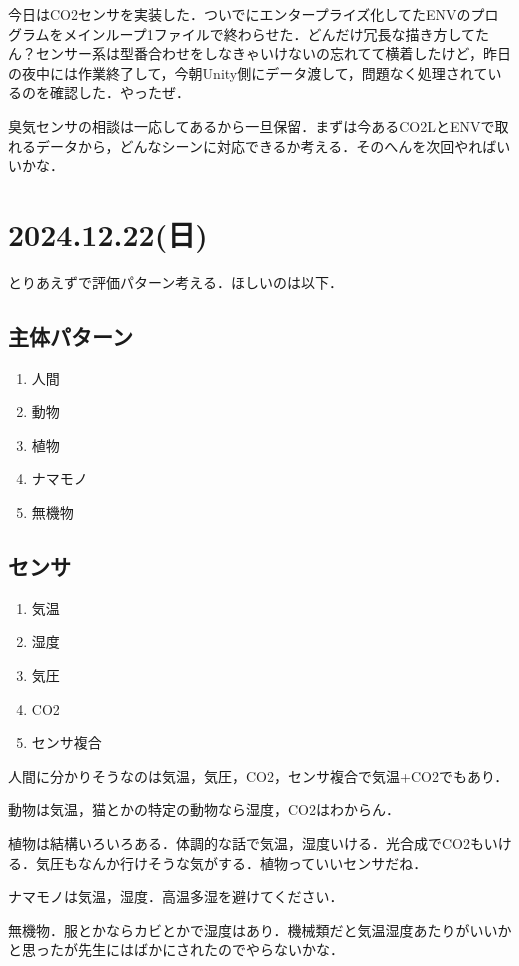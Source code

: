 \documentclass[fleqn,twocolumn]{mynote}
\begin{document}
  今日はCO2センサを実装した．ついでにエンタープライズ化してたENVのプログラムをメインループ1ファイルで終わらせた．どんだけ冗長な描き方してたん？センサー系は型番合わせをしなきゃいけないの忘れてて横着したけど，昨日の夜中には作業終了して，今朝Unity側にデータ渡して，問題なく処理されているのを確認した．やったぜ．

  臭気センサの相談は一応してあるから一旦保留．まずは今あるCO2LとENVで取れるデータから，どんなシーンに対応できるか考える．そのへんを次回やればいいかな．

  \section*{2024.12.22(日)}
  とりあえずで評価パターン考える．ほしいのは以下．
  \subsection*{主体パターン}
  \begin{enumerate}
    \item 人間
    \item 動物
    \item 植物
    \item ナマモノ
    \item 無機物
  \end{enumerate}

  \subsection*{センサ}
  \begin{enumerate}
    \item 気温
    \item 湿度
    \item 気圧
    \item CO2
    \item センサ複合
  \end{enumerate}

  人間に分かりそうなのは気温，気圧，CO2，センサ複合で気温+CO2でもあり．

  動物は気温，猫とかの特定の動物なら湿度，CO2はわからん．

  植物は結構いろいろある．体調的な話で気温，湿度いける．光合成でCO2もいける．気圧もなんか行けそうな気がする．植物っていいセンサだね．

  ナマモノは気温，湿度．高温多湿を避けてください．

  無機物．服とかならカビとかで湿度はあり．機械類だと気温湿度あたりがいいかと思ったが先生にはばかにされたのでやらないかな．
\end{document}
